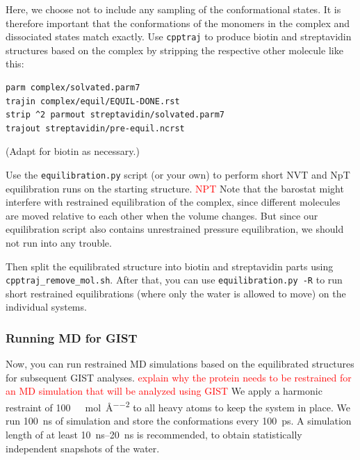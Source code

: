 \documentclass[9pt,tutorial]{livecoms}
\newcommand{\software}{\texttt}
\newcommand{\todo}{\textcolor{red}}
\begin{document}
Here, we choose not to include any sampling of the conformational states. 
It is therefore important that the conformations of the monomers in the complex and dissociated states match exactly. 
Use \software{cpptraj} to produce biotin and streptavidin structures based on the complex by stripping the respective other molecule like this:
\begin{lstlisting}[style=cpptraj]
parm complex/solvated.parm7
trajin complex/equil/EQUIL-DONE.rst
strip ^2 parmout streptavidin/solvated.parm7
trajout streptavidin/pre-equil.ncrst
\end{lstlisting}
(Adapt for biotin as necessary.)

Use the \software{equilibration.py} script (or your own) to perform short NVT and NpT equilibration runs on the starting structure.
\todo {NPT}
Note that the barostat might interfere with restrained equilibration of the complex, since different molecules are moved relative to each other when the volume changes.
But since our equilibration script also contains unrestrained pressure 
equilibration, we should not run into any trouble.

Then split the equilibrated structure into biotin and streptavidin parts using \software{cpptraj\_remove\_mol.sh}.
After that, you can use \software{equilibration.py -R} to run short restrained 
equilibrations (where only the water is allowed to move) on the individual 
systems.

\subsubsection{Running MD for GIST}

Now, you can run restrained MD simulations based on the equilibrated structures for subsequent GIST analyses.
\todo {explain why the protein needs to be restrained for an MD simulation that will be analyzed using GIST}
We apply a harmonic restraint of \SI{100}{\kilo\calorie\per\mole\per\angstrom\squared} to all heavy atoms to keep the system in place.
We run \SI{100}{\nano\second} of simulation and store the conformations every \SI{100}{\pico\second}.
A simulation length of at least \SIrange{10}{20}{\nano\second} is recommended, to obtain statistically independent snapshots of the water.
\end{document}
